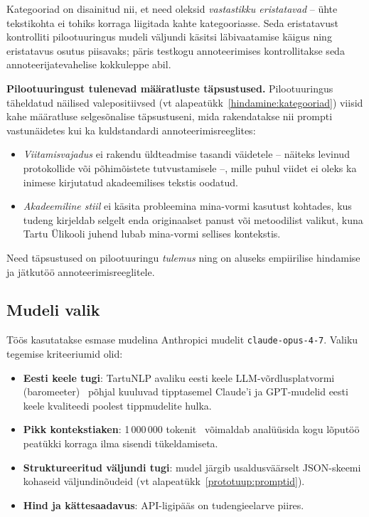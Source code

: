 Kategooriad on disainitud nii, et need oleksid \emph{vastastikku eristatavad} -- ühte tekstikohta ei tohiks korraga liigitada kahte kategooriasse. Seda eristatavust kontrolliti pilootuuringus mudeli väljundi käsitsi läbivaatamise käigus ning eristatavus osutus piisavaks; päris testkogu annoteerimises kontrollitakse seda annoteerijatevahelise kokkuleppe abil.

\textbf{Pilootuuringust tulenevad määratluste täpsustused.} Pilootuuringus täheldatud näilised valepositiivsed (vt alapeatükk~\ref{hindamine:kategooriad}) viisid kahe määratluse selgesõnalise täpsustuseni, mida rakendatakse nii prompti vastunäidetes kui ka kuldstandardi annoteerimisreeglites:
\begin{itemize}
    \item \emph{Viitamisvajadus} ei rakendu üldteadmise tasandi väidetele -- näiteks levinud protokollide või põhimõistete tutvustamisele --, mille puhul viidet ei oleks ka inimese kirjutatud akadeemilises tekstis oodatud.
    \item \emph{Akadeemiline stiil} ei käsita probleemina mina-vormi kasutust kohtades, kus tudeng kirjeldab selgelt enda originaalset panust või metoodilist valikut, kuna Tartu Ülikooli juhend lubab mina-vormi sellises kontekstis.
\end{itemize}
Need täpsustused on pilootuuringu \emph{tulemus} ning on aluseks empiirilise hindamise ja jätkutöö annoteerimisreeglitele.

\subsection{Mudeli valik} \label{metoodika:mudel}

Töös kasutatakse esmase mudelina Anthropici mudelit \texttt{claude-opus-4-7}. Valiku tegemise kriteeriumid olid:
\begin{itemize}
    \item \textbf{Eesti keele tugi}: TartuNLP avaliku eesti keele LLM-võrdlusplatvormi (baromeeter)~\cite{tartunlp_baromeeter_2025} põhjal kuuluvad tipptasemel Claude'i ja GPT-mudelid eesti keele kvaliteedi poolest tippmudelite hulka.
    \item \textbf{Pikk kontekstiaken}: 1\,000\,000 tokenit~\cite{anthropic_models_2026} võimaldab analüüsida kogu lõputöö peatükki korraga ilma sisendi tükeldamiseta.
    \item \textbf{Struktureeritud väljundi tugi}: mudel järgib usaldusväärselt JSON-skeemi kohaseid väljundinõudeid (vt alapeatükk~\ref{prototuup:promptid}).
    \item \textbf{Hind ja kättesaadavus}: API-ligipääs on tudengieelarve piires.
\end{itemize}

